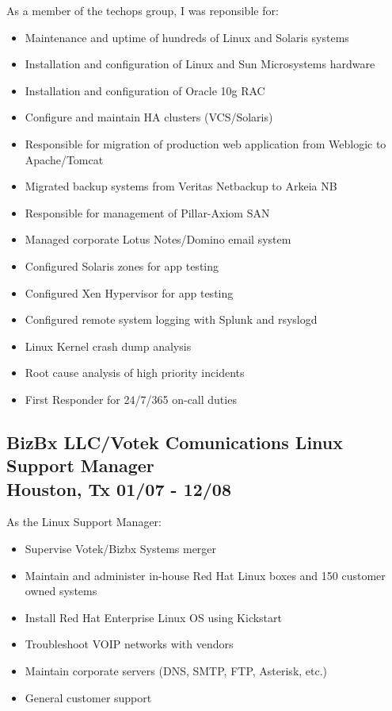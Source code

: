 \documentclass{article}
\begin{document}
  As a member of the techops group, I was reponsible for:\\
  \begin{itemize}
  \item Maintenance and uptime of hundreds of Linux and Solaris systems
  \item Installation and configuration of Linux and Sun Microsystems hardware
  \item Installation and configuration of Oracle 10g RAC
  \item Configure and maintain HA clusters (VCS/Solaris)
  \item Responsible for migration of production web application from Weblogic to Apache/Tomcat
  \item Migrated backup systems from Veritas Netbackup to Arkeia NB
  \item Responsible for management of Pillar-Axiom SAN
  \item Managed corporate Lotus Notes/Domino email system
  \item Configured Solaris zones for app testing
  \item Configured Xen Hypervisor for app testing
  \item Configured remote system logging with Splunk and rsyslogd
  \item Linux Kernel crash dump analysis
  \item Root cause analysis of high priority incidents
  \item First Responder for 24/7/365 on-call duties
  \end{itemize}

  \subsection{BizBx LLC/Votek Comunications \hfill Linux Support Manager\\
    Houston, Tx \hfill 01/07 - 12/08\\
  }

  As the Linux Support Manager:\\
  \begin{itemize}
  \item Supervise Votek/Bizbx Systems merger
  \item Maintain and administer in-house Red Hat Linux boxes and 150 customer owned systems
  \item Install Red Hat Enterprise Linux OS using Kickstart
  \item Troubleshoot VOIP networks with vendors
  \item Maintain corporate servers (DNS, SMTP, FTP, Asterisk, etc.)
  \item General customer support
  \end{itemize}
\end{document}
